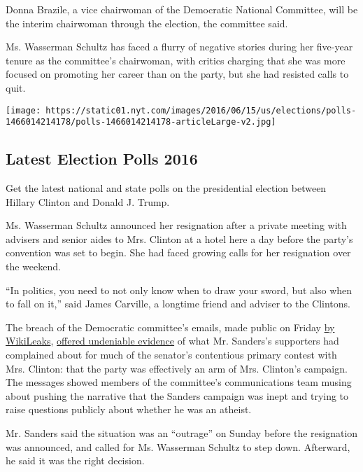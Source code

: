 Donna Brazile, a vice chairwoman of the Democratic National Committee,
will be the interim chairwoman through the election, the committee said.

Ms. Wasserman Schultz has faced a flurry of negative stories during her
five-year tenure as the committee's chairwoman, with critics charging
that she was more focused on promoting her career than on the party, but
she had resisted calls to quit.

\href{https://www.nytimes.com/interactive/2016/us/elections/polls.html}{}

\texttt{[image: https://static01.nyt.com/images/2016/06/15/us/elections/polls-1466014214178/polls-1466014214178-articleLarge-v2.jpg]}

\hypertarget{latest-election-polls-2016}{%
\subsection{Latest Election Polls
2016}\label{latest-election-polls-2016}}

Get the latest national and state polls on the presidential election
between Hillary Clinton and Donald J. Trump.

Ms. Wasserman Schultz announced her resignation after a private meeting
with advisers and senior aides to Mrs. Clinton at a hotel here a day
before the party's convention was set to begin. She had faced growing
calls for her resignation over the weekend.

``In politics, you need to not only know when to draw your sword, but
also when to fall on it,'' said James Carville, a longtime friend and
adviser to the Clintons.

The breach of the Democratic committee's emails, made public on Friday
\href{https://wikileaks.com/dnc-emails/}{by WikiLeaks},
\href{http://www.nytimes.com/2016/07/23/us/politics/dnc-emails-sanders-clinton.html}{offered
undeniable evidence} of what Mr. Sanders's supporters had complained
about for much of the senator's contentious primary contest with Mrs.
Clinton: that the party was effectively an arm of Mrs. Clinton's
campaign. The messages showed members of the committee's communications
team musing about pushing the narrative that the Sanders campaign was
inept and trying to raise questions publicly about whether he was an
atheist.

Mr. Sanders said the situation was an ``outrage'' on Sunday before the
resignation was announced, and called for Ms. Wasserman Schultz to step
down. Afterward, he said it was the right decision.

